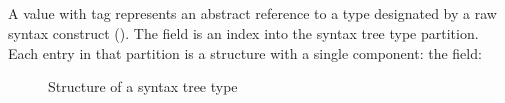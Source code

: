 \subsection{}
\label{sec:ifc:TypeSort:SyntaxTree}

A  value with tag  represents an abstract 
reference to a type designated by a raw syntax construct ().
The  field is an index into the syntax tree type partition.
Each entry in that partition is a structure with a single component: the  field:
%
\begin{figure}[H]
	\centering
	\caption{Structure of a syntax tree type}
	\label{fig:ifc-syntax-tree-type-structure}
\end{figure}
%




